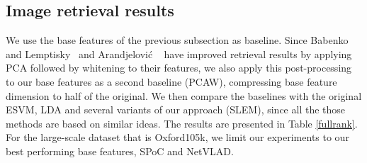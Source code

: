 



\subsection{Image retrieval results}
We use the base features of the previous subsection as baseline. Since Babenko and Lemptisky~\cite{babenko15} and Arandjelovi\'c \etal~\cite{Arandjelovic15} have improved retrieval results by applying PCA followed by whitening to their features, we also apply this post-processing to our base features as a second baseline (PCAW), compressing base feature dimension to half of the original. We then compare the baselines with the original ESVM, LDA and several variants of our approach (SLEM), since all the those methods are based on similar ideas. The results are presented in Table \ref{fullrank}. For the large-scale dataset that is Oxford105k, we limit our experiments to our best performing base features, SPoC and NetVLAD.

